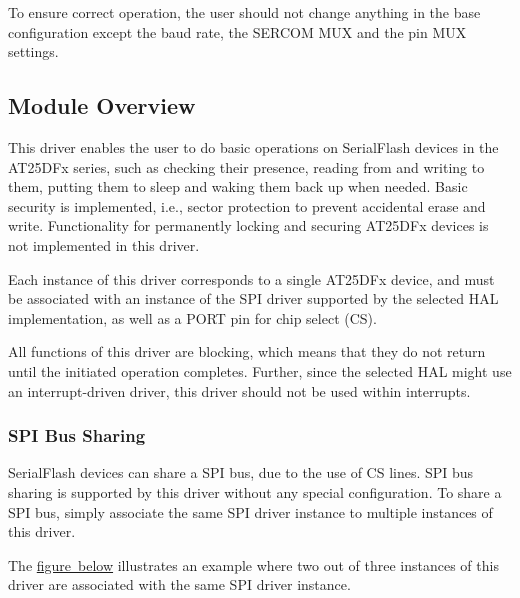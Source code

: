 To ensure correct operation, the user should not change anything in the base configuration except the baud rate, the S\+E\+R\+C\+OM M\+UX and the pin M\+UX settings.\hypertarget{group__asfdoc__common2__at25dfx__group_asfdoc_common2_at25dfx_module_overview}{}\subsection{Module Overview}\label{group__asfdoc__common2__at25dfx__group_asfdoc_common2_at25dfx_module_overview}
This driver enables the user to do basic operations on Serial\+Flash devices in the A\+T25\+D\+Fx series, such as checking their presence, reading from and writing to them, putting them to sleep and waking them back up when needed. Basic security is implemented, i.\+e., sector protection to prevent accidental erase and write. Functionality for permanently locking and securing A\+T25\+D\+Fx devices is not implemented in this driver.

Each instance of this driver corresponds to a single A\+T25\+D\+Fx device, and must be associated with an instance of the S\+PI driver supported by the selected H\+AL implementation, as well as a P\+O\+RT pin for chip select (CS).

All functions of this driver are blocking, which means that they do not return until the initiated operation completes. Further, since the selected H\+AL might use an interrupt-\/driven driver, this driver should not be used within interrupts.\hypertarget{group__asfdoc__common2__at25dfx__group_asfdoc_common2_at25dfx_module_spi_share}{}\subsubsection{S\+P\+I Bus Sharing}\label{group__asfdoc__common2__at25dfx__group_asfdoc_common2_at25dfx_module_spi_share}
Serial\+Flash devices can share a S\+PI bus, due to the use of CS lines. S\+PI bus sharing is supported by this driver without any special configuration. To share a S\+PI bus, simply associate the same S\+PI driver instance to multiple instances of this driver.

The \mbox{\hyperlink{group__asfdoc__common2__at25dfx__group_asfdoc_sam0_at25dfx_example}{figure below}} illustrates an example where two out of three instances of this driver are associated with the same S\+PI driver instance.

